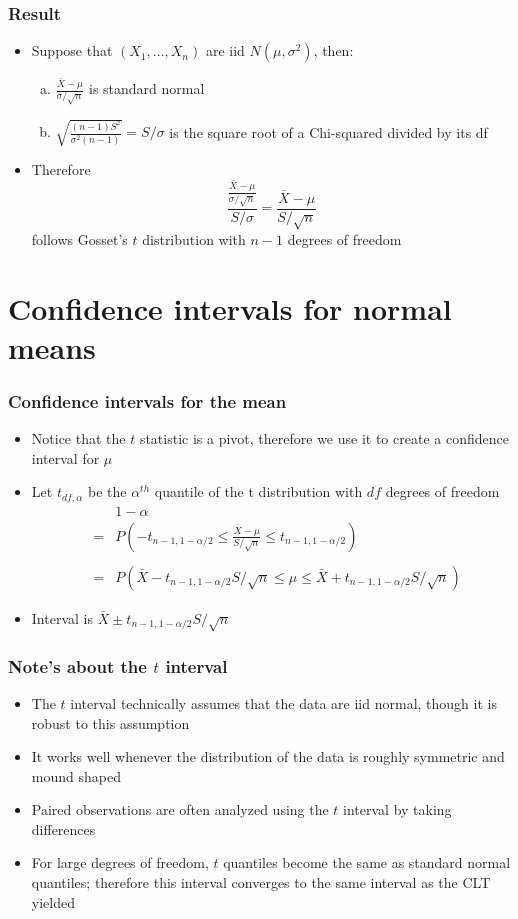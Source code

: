 \documentclass[aspectratio=169]{beamer}
\begin{document}
\begin{frame}\frametitle{Result}
\begin{itemize}
\item Suppose that $(X_1,\ldots,X_n)$ are iid $N(\mu,\sigma^2)$,
  then:
  \begin{enumerate}[a.]
  \item $\frac{\bar X - \mu}{\sigma / \sqrt{n}}$ is standard normal
  \item $\sqrt{\frac{(n - 1) S^2}{\sigma^2 (n - 1)}} = S / \sigma$
    is the square root of a Chi-squared divided by its df
  \end{enumerate}
  \item Therefore 
    $$
\frac{\frac{\bar X - \mu}{\sigma /\sqrt{n}}}{S/\sigma}  
= \frac{\bar X - \mu}{S/\sqrt{n}}
    $$
    follows Gosset's $t$ distribution with $n-1$ degrees of freedom
\end{itemize}
\end{frame}

\section{Confidence intervals for normal means}
\begin{frame}\frametitle{Confidence intervals for the mean}
\begin{itemize}
\item Notice that the $t$ statistic is a pivot, therefore we use it
  to create a confidence interval for $\mu$
\item Let $t_{df,\alpha}$ be the $\alpha^{th}$ quantile of the t distribution with
  $df$ degrees of freedom
  \begin{eqnarray*}
&   & 1 - \alpha \\
& = & P\left(-t_{n-1,1-\alpha/2} \leq \frac{\bar X - \mu}{S/\sqrt{n}} \leq t_{n-1,1-\alpha/2}\right) \\ \\
& = & P\left(\bar X - t_{n-1,1-\alpha/2} S / \sqrt{n} \leq \mu  
      \leq \bar X + t_{n-1,1-\alpha/2}S /\sqrt{n}\right)
  \end{eqnarray*}
\item Interval is $\bar X \pm t_{n-1,1-\alpha/2} S/\sqrt{n}$
\end{itemize}
\end{frame}

\begin{frame}\frametitle{Note's about the $t$ interval}
\begin{itemize}
\item The $t$ interval technically assumes that the data are iid normal,
  though it is robust to this assumption
\item It works well whenever the distribution of the data is roughly
  symmetric and mound shaped
\item Paired observations are often analyzed using the $t$ interval by
  taking differences
\item For large degrees of freedom, $t$ quantiles become the same as standard
  normal quantiles; therefore this interval converges to the same interval as
  the CLT yielded
\end{itemize}
\end{frame}
\end{document}
